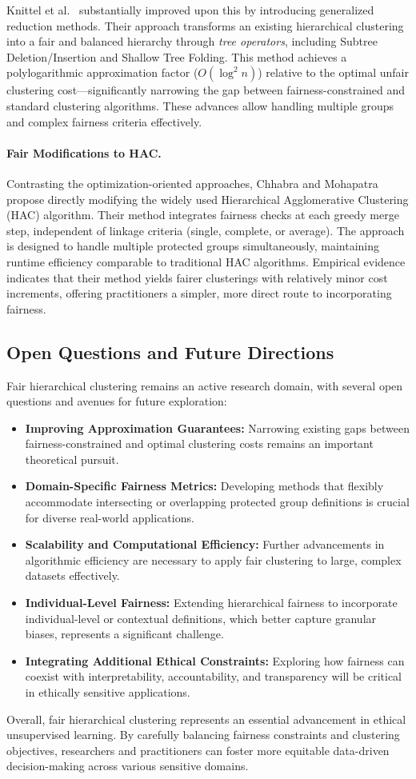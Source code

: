 Knittel et al.~\cite{knittel2023} substantially improved upon this by
introducing generalized reduction methods. Their approach transforms
an existing hierarchical clustering into a fair and balanced
hierarchy through \emph{tree operators}, including Subtree
Deletion/Insertion and Shallow Tree Folding. This method achieves a
polylogarithmic approximation factor ($O(\log^2 n)$) relative to the
optimal unfair clustering cost—significantly narrowing the gap
between fairness-constrained and standard clustering algorithms.
These advances allow handling multiple groups and complex fairness
criteria effectively.

\paragraph{Fair Modifications to HAC.} Contrasting the
optimization-oriented approaches, Chhabra and
Mohapatra~\cite{chhabra2023} propose directly modifying the widely
used Hierarchical Agglomerative Clustering (HAC) algorithm. Their
method integrates fairness checks at each greedy merge step,
independent of linkage criteria (single, complete, or average). The
approach is designed to handle multiple protected groups
simultaneously, maintaining runtime efficiency comparable to
traditional HAC algorithms. Empirical evidence indicates that their
method yields fairer clusterings with relatively minor cost
increments, offering practitioners a simpler, more direct route to
incorporating fairness.

\subsection{Open Questions and Future Directions}

Fair hierarchical clustering remains an active research domain, with
several open questions and avenues for future exploration:

\begin{itemize}
  \item \textbf{Improving Approximation Guarantees:} Narrowing
    existing gaps between fairness-constrained and optimal clustering
    costs remains an important theoretical pursuit.
  \item \textbf{Domain-Specific Fairness Metrics:} Developing methods
    that flexibly accommodate intersecting or overlapping protected
    group definitions is crucial for diverse real-world applications.
  \item \textbf{Scalability and Computational Efficiency:} Further
    advancements in algorithmic efficiency are necessary to apply
    fair clustering to large, complex datasets effectively.
  \item \textbf{Individual-Level Fairness:} Extending hierarchical
    fairness to incorporate individual-level or contextual
    definitions, which better capture granular biases, represents a
    significant challenge.
  \item \textbf{Integrating Additional Ethical Constraints:}
    Exploring how fairness can coexist with interpretability,
    accountability, and transparency will be critical in ethically
    sensitive applications.
\end{itemize}

Overall, fair hierarchical clustering represents an essential
advancement in ethical unsupervised learning. By carefully balancing
fairness constraints and clustering objectives, researchers and
practitioners can foster more equitable data-driven decision-making
across various sensitive domains.
